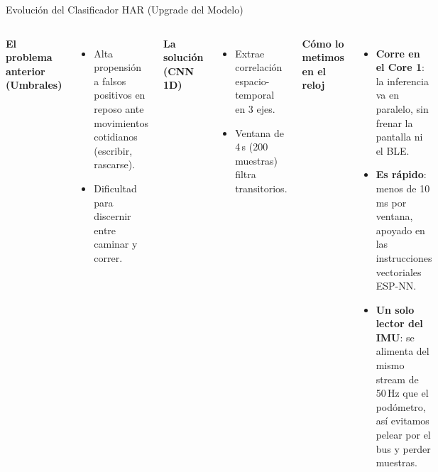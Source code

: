 \documentclass[aspectratio=169, 10pt]{beamer}
\begin{document}
\begin{frame}{Evolución del Clasificador HAR (Upgrade del Modelo)}
    \begin{columns}[T]
        \footnotesize
        \textbf{El problema anterior (Umbrales)}
        \begin{itemize}\itemsep0.10cm
            \item Alta propensión a falsos positivos en reposo ante movimientos cotidianos (escribir, rascarse).
            \item Dificultad para discernir entre caminar y correr.
        \end{itemize}
        \vspace{0.2cm}
        \textbf{La solución (CNN 1D)}
        \begin{itemize}\itemsep0.10cm
            \item Extrae correlación espacio-temporal en 3 ejes.
            \item Ventana de 4\,s (200 muestras) filtra transitorios.
        \end{itemize}
        \footnotesize
        \textbf{C\'omo lo metimos en el reloj}
        \begin{itemize}\itemsep0.10cm
            \item \textbf{Corre en el Core 1}: la inferencia va en paralelo, sin frenar la pantalla ni el BLE.
            \item \textbf{Es r\'apido}: menos de 10\,ms por ventana, apoyado en las instrucciones vectoriales ESP-NN.
            \item \textbf{Un solo lector del IMU}: se alimenta del mismo stream de 50\,Hz que el pod\'ometro, as\'i evitamos pelear por el bus y perder muestras.
        \end{itemize}
    \end{columns}
\end{frame}
\end{document}
